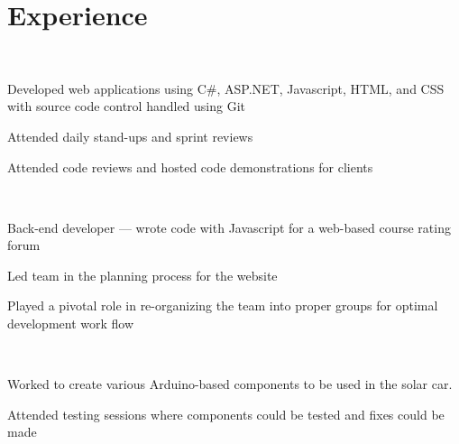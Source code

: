 \documentclass[]{Resume_template}
\begin{document}
\begin{minipage}[t]{0.66\textwidth} 


\section{Experience}
 \\
\vspace{\topsep}
\begin{tightemize}
\item Developed web applications using C\#, ASP.NET, Javascript, HTML, and CSS with source code control handled using Git
\item Attended daily stand-ups and sprint reviews
\item Attended code reviews and hosted code demonstrations for clients
\end{tightemize}
\sectionsep

 \\
\begin{tightemize}
\item Back-end developer --- wrote code with Javascript for a web-based course rating forum
\item Led team in the planning process for the website
\item Played a pivotal role in re-organizing the team into proper groups for optimal development work flow
\end{tightemize}
\sectionsep


\\
\begin{tightemize}
\item Worked to create various Arduino-based components to be used in the solar car.
\item Attended testing sessions where components could be tested and fixes could be made
\end{tightemize}
\sectionsep




\end{minipage}
\end{document}
